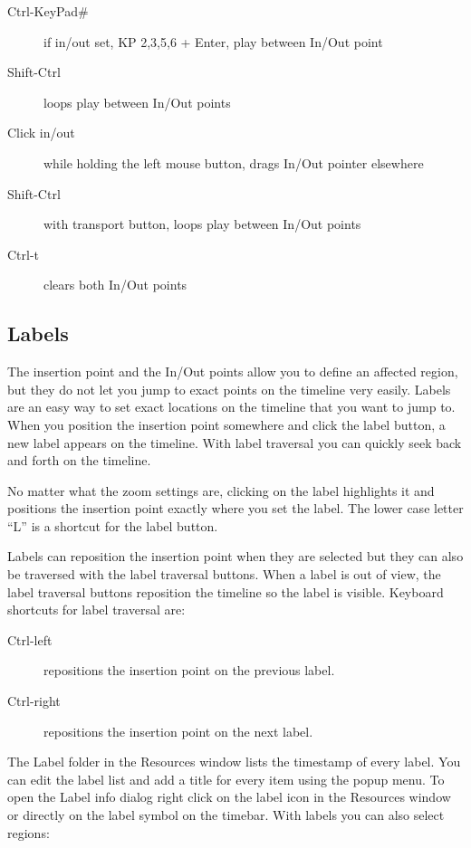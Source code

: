 \begin{description}
    \item[Ctrl-KeyPad\#]  if in/out set, KP 2,3,5,6 + Enter, play between In/Out point
    \item[Shift-Ctrl]  loops play between In/Out points
    \item[Click in/out] while holding the left mouse button, drags In/Out pointer elsewhere
    \item[Shift-Ctrl] with transport button, loops play between In/Out points
    \item[Ctrl-t]  clears both In/Out points
\end{description}

\subsection{Labels}%
\label{sub:labels}

The insertion point and the In/Out points allow you to define an affected region, but they do not let you jump to exact points on the timeline very easily. 
Labels are an easy way to set exact locations on the timeline that you want to jump to. 
When you position the insertion point somewhere and click the label button, a new label appears on the timeline. 
With label traversal you can quickly seek back and forth on the timeline.

No matter what the zoom settings are, clicking on the label highlights it and positions the insertion point exactly where you set the label. 
The lower case letter “L” is a shortcut for the label button.

Labels can reposition the insertion point when they are selected but they can also be traversed with the label traversal buttons. When a label is out of view, the label traversal buttons reposition the timeline so the label is visible. Keyboard shortcuts for label traversal are:

\begin{description}
    \item[Ctrl-left] repositions the insertion point on the previous label.
    \item[Ctrl-right] repositions the insertion point on the next label.
\end{description}

The Label folder in the Resources window lists the timestamp of every label. 
You can edit the label list and add a title for every item using the popup menu. 
To open the Label info dialog right click on the label icon in the Resources window or directly on the label symbol on the timebar. 
With labels you can also select regions:

